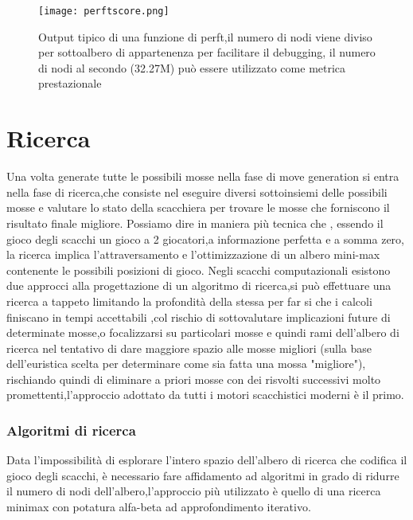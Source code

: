 \begin{figure}[H]
    \centering
    \texttt{[image: perftscore.png]}
    \caption{Output tipico di una funzione di perft,il numero di nodi viene diviso per sottoalbero di appartenenza per facilitare il debugging, il numero di nodi al secondo (32.27M) può essere utilizzato come metrica prestazionale}
\end{figure}


\section{Ricerca} \label{ricerca}
Una volta generate tutte le possibili mosse nella fase di move generation si entra nella fase di ricerca,che consiste nel eseguire diversi sottoinsiemi delle possibili mosse e valutare
lo stato della scacchiera per trovare le mosse che forniscono il risultato finale migliore. Possiamo dire in maniera più tecnica che , essendo il gioco degli scacchi un gioco
a 2 giocatori,a informazione perfetta e a somma zero, la ricerca implica l'attraversamento e l'ottimizzazione di un albero mini-max contenente le possibili posizioni di gioco.
Negli scacchi computazionali esistono due approcci alla progettazione di un algoritmo di ricerca,si può effettuare una ricerca a tappeto limitando la profondità
della stessa per far si che i calcoli finiscano in tempi accettabili ,col rischio di sottovalutare implicazioni future di determinate mosse,o focalizzarsi su particolari mosse e quindi
rami dell'albero di ricerca nel tentativo di dare maggiore spazio alle mosse migliori (sulla base dell'euristica scelta per determinare come sia fatta una mossa "migliore"), rischiando
quindi di eliminare a priori mosse con dei risvolti successivi molto promettenti,l'approccio adottato da tutti i motori scacchistici moderni è il primo.

\subsubsection{Algoritmi di ricerca}
Data l'impossibilità di esplorare l'intero spazio dell'albero di ricerca che codifica il gioco degli scacchi, è necessario fare affidamento ad algoritmi in
grado di ridurre il numero di nodi dell'albero,l'approccio più utilizzato è quello di una ricerca minimax con potatura alfa-beta ad approfondimento iterativo.



